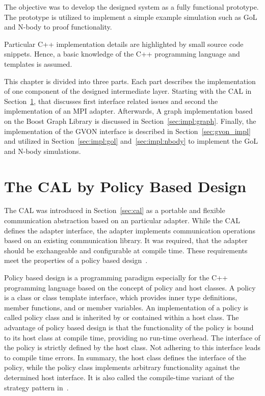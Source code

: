 The objective was to develop the designed system as a fully functional prototype.
The prototype is utilized to implement a simple example simulation such as GoL
and N-body to proof functionality. 

Particular C++ implementation details are highlighted by small source
code snippets. Hence, a basic knowledge of the C++ programming
language and templates is assumed.

This chapter is divided into three parts. Each part describes the
implementation of one component of the designed intermediate layer.
Starting with the CAL in Section~\ref{sec:impl:cal}, that discusses
first interface related issues and second the implementation
of an MPI adapter. Afterwards, A graph implementation based on the
Boost Graph Library is discussed in
Section~\ref{sec:impl:graph}. Finally, the implementation of the GVON
interface is described in Section~\ref{sec:gvon_impl} and utilized in
Section~\ref{sec:impl:gol} and~\ref{sec:impl:nbody} to implement the
GoL and N-body simulations.


\section{The CAL by Policy Based Design}
\label{sec:impl:cal}

The CAL was introduced in Section~\ref{sec:cal} as a portable and
flexible communication abstraction based on an particular
adapter. While the CAL defines the adapter interface, the adapter
implements communication operations based on an existing communication
library.  It was required, that the adapter should be exchangeable and
configurable at compile time. These requirements meet the properties
of a policy based design~\cite{ref:policy_based_design}.

Policy based design is a programming paradigm especially for the C++
programming language based on the concept of policy and host classes.
A policy is a class or class template interface, which provides inner
type definitions, member functions, and or member variables. An
implementation of a policy is called policy class and is inherited by
or contained within a host class.  The advantage of policy based
design is that the functionality of the policy is bound to its host
class at compile time, providing no run-time overhead.  The interface
of the policy is strictly defined by the host class. Not adhering to this
interface leads to compile time errors. In summary, the host class
defines the interface of the policy, while the policy class implements
arbitrary functionality against the determined host interface. It is
also called the compile-time variant of the strategy pattern
in~\cite{ref:policy_strategy}.

